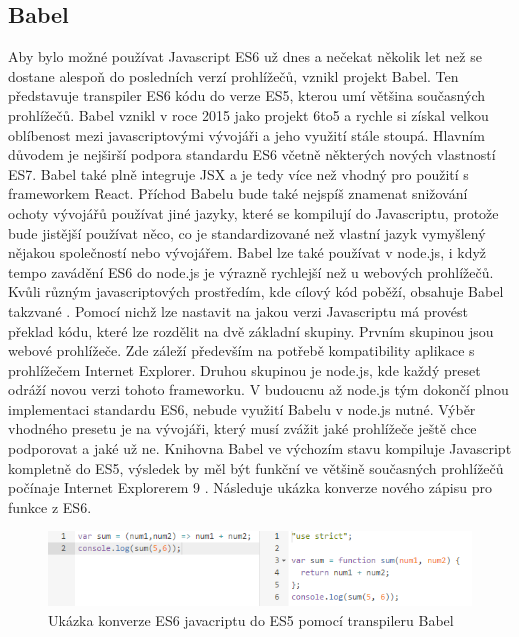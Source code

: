 \subsection{Babel}
\label{sec:babel}
Aby bylo možné používat Javascript ES6 už dnes a nečekat několik let než se dostane alespoň do posledních verzí prohlížečů, vznikl projekt Babel. Ten představuje transpiler ES6 kódu do verze ES5, kterou umí většina současných prohlížečů. Babel vznikl v roce 2015 jako projekt 6to5 a rychle si získal velkou oblíbenost mezi javascriptovými vývojáři a jeho využití stále stoupá. Hlavním důvodem je nejširší podpora standardu ES6 včetně některých nových vlastností ES7. Babel také plně integruje JSX a je tedy více než vhodný pro použití s frameworkem React. Příchod Babelu bude také nejspíš znamenat snižování ochoty vývojářů používat jiné jazyky, které se kompilují do Javascriptu, protože bude jistější používat něco, co je standardizované než vlastní jazyk vymyšlený nějakou společností nebo vývojářem. Babel lze také používat v node.js, i když tempo zavádění ES6 do node.js je výrazně rychlejší než u webových prohlížečů. Kvůli různým javascriptových prostředím, kde cílový kód poběží, obsahuje Babel takzvané . Pomocí nichž lze nastavit na jakou verzi Javascriptu má provést překlad kódu, které lze rozdělit na dvě základní skupiny. Prvním skupinou jsou webové prohlížeče. Zde záleží především na potřebě kompatibility aplikace s prohlížečem Internet Explorer. Druhou skupinou je node.js, kde každý preset odráží novou verzi tohoto frameworku. V budoucnu až node.js tým dokončí plnou implementaci standardu ES6, nebude využití Babelu v node.js nutné. Výběr vhodného presetu je na vývojáři, který musí zvážit jaké prohlížeče ještě chce podporovat a jaké už ne. Knihovna Babel ve výchozím stavu kompiluje Javascript kompletně do ES5, výsledek by měl být funkční ve většině současných prohlížečů počínaje Internet Explorerem 9 \cite{babel} \cite{babel_what}. Následuje ukázka konverze nového zápisu pro funkce z ES6.
\vspace{0,3cm}
\begin{figure}[h]
\begin{centering}
\includegraphics[scale=0.6]{obrazky/babel}
\par\end{centering}
\caption{Ukázka konverze ES6 javacriptu do ES5 pomocí transpileru Babel \cite{babel} \label{fig:babel}}
\end{figure}
\FloatBarrier


